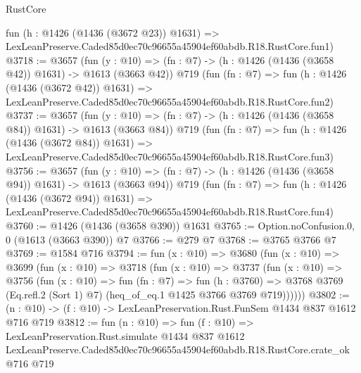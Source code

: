 \begin{lexlean}{RustCore}
\begin{coremodule}
    fun (h : @1426 (@1436 (@3672 @23)) @1631) =>
    LexLeanPreserve.Caded85d0ec70c96655a45904ef60abdb.R18.RustCore.fun1)
@3718 := @3657
    (fun (y : @10) => (fn : @7) -> (h : @1426 (@1436 (@3658 @42)) @1631) -> @1613 (@3663 @42))
    @719
    (fun (fn : @7) =>
    fun (h : @1426 (@1436 (@3672 @42)) @1631) =>
    LexLeanPreserve.Caded85d0ec70c96655a45904ef60abdb.R18.RustCore.fun2)
@3737 := @3657
    (fun (y : @10) => (fn : @7) -> (h : @1426 (@1436 (@3658 @84)) @1631) -> @1613 (@3663 @84))
    @719
    (fun (fn : @7) =>
    fun (h : @1426 (@1436 (@3672 @84)) @1631) =>
    LexLeanPreserve.Caded85d0ec70c96655a45904ef60abdb.R18.RustCore.fun3)
@3756 := @3657
    (fun (y : @10) => (fn : @7) -> (h : @1426 (@1436 (@3658 @94)) @1631) -> @1613 (@3663 @94))
    @719
    (fun (fn : @7) =>
    fun (h : @1426 (@1436 (@3672 @94)) @1631) =>
    LexLeanPreserve.Caded85d0ec70c96655a45904ef60abdb.R18.RustCore.fun4)
@3760 := @1426 (@1436 (@3658 @390)) @1631
@3765 := Option.noConfusion.{0, 0} (@1613 (@3663 @390)) @7
@3766 := @279 @7
@3768 := @3765 @3766 @7
@3769 := @1584 @716
@3794 := fun (x : @10) =>
  @3680
    (fun (x : @10) =>
    @3699
      (fun (x : @10) =>
      @3718
        (fun (x : @10) =>
        @3737
          (fun (x : @10) =>
          @3756
            (fun (x : @10) =>
            fun (fn : @7) =>
            fun (h : @3760) =>
            @3768 @3769 (Eq.refl.{2} (Sort 1) @7) (heq_of_eq.{1} @1425 @3766 @3769 @719))))))
@3802 := (n : @10) -> (f : @10) -> LexLeanPreservation.Rust.FunSem @1434 @837 @1612 @716 @719
@3812 := fun (n : @10) =>
  fun (f : @10) =>
  LexLeanPreservation.Rust.simulate
    @1434
    @837
    @1612
    LexLeanPreserve.Caded85d0ec70c96655a45904ef60abdb.R18.RustCore.crate_ok
    @716
    @719
\end{coremodule}
\end{lexlean}
